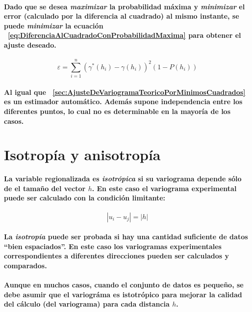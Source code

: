 \paragraph{
Dado que se desea \emph{maximizar} la probabilidad máxima y \emph{minimizar} el error (calculado por la diferencia al cuadrado) al mismo instante, se puede \emph{minimizar} la ecuación ~\ref{eq:DiferenciaAlCuadradoConProbabilidadMaxima} para obtener el ajuste deseado.
}
\begin{equation}
\label{eq:DiferenciaAlCuadradoConProbabilidadMaxima}
\varepsilon = \sum_{i=1}^n (\gamma^*(h_i) - \gamma(h_i))^2 (1 - P(h_i))
\end{equation}
\paragraph{
Al igual que ~\ref{sec:AjusteDeVariogramaTeoricoPorMinimosCuadrados} es un estimador automático. Además supone independencia entre los diferentes puntos, lo cual no es determinable en la mayoría de los casos.
}



\section{Isotropía y anisotropía}
\paragraph{
La variable regionalizada es \emph{isotrópica} si su variograma depende sólo de el tamaño del vector $h$. En este caso el variograma experimental puede ser calculado con la condición limitante:
}
\begin{equation}
|u_i - u_j|=|h|
\end{equation}
\paragraph*{
La \emph{isotropía} puede ser probada si hay una cantidad suficiente de datos ``bien espaciados''\footnotemark[19]. En este caso los variogramas experimentales correspondientes a diferentes direcciones pueden ser calculados y comparados.
}
\paragraph{
Aunque en muchos casos, cuando el conjunto de datos es pequeño, se debe asumir que el variográma es istotrópico para mejorar la calidad del cálculo (del variograma) para cada distancia $h$.
}
